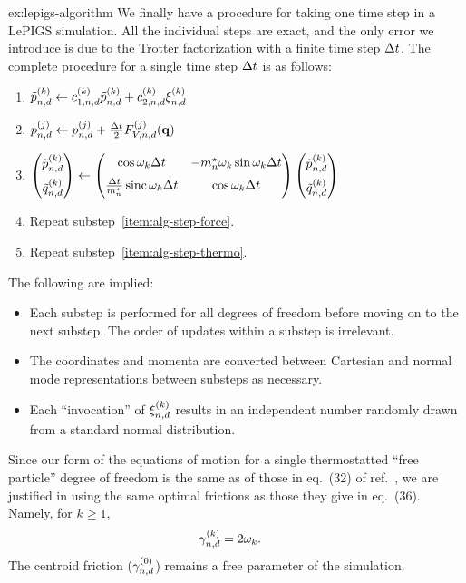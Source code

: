 \begin{DefAnswer}{ex:lepigs-algorithm}
	We finally have a procedure for taking one time step in a LePIGS simulation.
	All the individual steps are exact, and the only error we introduce is due to the Trotter factorization with a finite time step $\Delta t$.
	The complete procedure for a single time step $\Delta t$ is as follows:
	\begin{enumerate}
		\item $\tilde{p}_{n,d}^{(k)} \gets c_{1,n,d}^{(k)} \tilde{p}_{n,d}^{(k)} + c_{2,n,d}^{(k)} \xi_{n,d}^{(k)}$ \label{item:alg-step-thermo}
		\item $p_{n,d}^{(j)} \gets p_{n,d}^{(j)} + \frac{\Delta t}{2} F_{V,n,d}^{(j)}(\bm{\mathbf{q}})$ \label{item:alg-step-force}
		\item $
			\begin{pmatrix}
				\tilde{p}_{n,d}^{(k)} \\[2 mm]
				\tilde{q}_{n,d}^{(k)}
			\end{pmatrix}
			\gets \begin{pmatrix}
					\cos{\omega_k \Delta t} & -{m}^\star_n \omega_k \sin{\omega_k \Delta t} \\[2 mm]
					\frac{\Delta t}{{m}^\star_n} \operatorname{sinc}{\omega_k \Delta t} & \cos{\omega_k \Delta t}
				\end{pmatrix}
				\begin{pmatrix}
					\tilde{p}_{n,d}^{(k)} \\[2 mm]
					\tilde{q}_{n,d}^{(k)}
				\end{pmatrix}
			$
		\item Repeat substep~\ref{item:alg-step-force}.
		\item Repeat substep~\ref{item:alg-step-thermo}.
	\end{enumerate}
	The following are implied:
	\begin{itemize}
		\item Each substep is performed for all degrees of freedom before moving on to the next substep.
			The order of updates within a substep is irrelevant.
		\item The coordinates and momenta are converted between Cartesian and normal mode representations between substeps as necessary.
		\item Each ``invocation'' of $\xi_{n,d}^{(k)}$ results in an independent number randomly drawn from a standard normal distribution.
	\end{itemize}

	Since our form of the equations of motion for a single thermostatted ``free particle'' degree of freedom is the same as of those in eq.~(32) of ref.~\cite{ceriotti2010efficient}, we are justified in using the same optimal frictions as those they give in eq.~(36).
	Namely, for $k \ge 1$,
	\begin{align}
		\gamma_{n,d}^{(k)}
		&= 2 \omega_k.
	\end{align}
	The centroid friction ($\gamma_{n,d}^{(0)}$) remains a free parameter of the simulation.
\end{DefAnswer}

